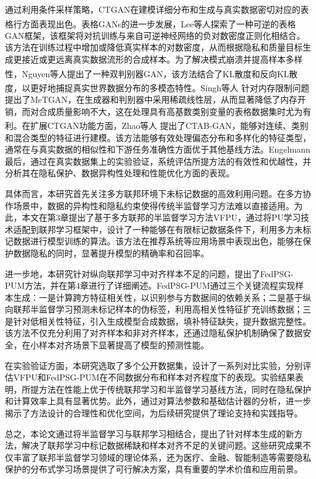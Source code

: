 通过利用条件采样策略，CTGAN在建模详细分布和生成与真实数据密切对应的表格行方面表现出色。表格GANs的进一步发展，Lee等人\textsuperscript{\cite{lee2021invertible}}探索了一种可逆的表格GAN框架，该框架将对抗训练与来自可逆神经网络的负对数密度正则化相结合。该方法在训练过程中增加或降低真实样本的对数密度，从而根据隐私和质量目标生成更接近或更远离真实数据流形的合成样本。为了解决模式崩溃并提高样本多样性，Nguyen等人\textsuperscript{\cite{nguyen2017dual}}提出了一种双判别器GAN，该方法结合了KL散度和反向KL散度，以更好地捕捉真实世界数据分布的多模态特性。Singh等人\textsuperscript{\cite{singh2021metgan}} 针对内存限制问题提出了MeTGAN，在生成器和判别器中采用稀疏线性层，从而显著降低了内存开销，而对合成质量影响不大，这在处理具有高基数类别变量的表格数据集时尤为有利。在扩展CTGAN功能方面，Zhao等人\textsuperscript{\cite{zhao2021ctab}} 提出了CTAB-GAN，能够对连续、类别和混合类型的特征进行建模。该方法能够有效处理偏态分布和多样化的特征类型，通常在与真实数据的相似性和下游任务准确性方面优于其他基线方法。Engelmann最后，通过在真实数据集上的实验验证，系统评估所提方法的有效性和优越性，并分析其在隐私保护、数据异构性处理和性能优化方面的表现。

具体而言，本研究首先关注多方联邦环境下未标记数据的高效利用问题。在多方协作场景中，数据的异构性和隐私约束使得传统半监督学习方法难以直接适用。为此，本文在第3章提出了基于多方联邦的半监督学习方法VFPU，通过将PU学习技术适配到联邦学习框架中，设计了一种能够在有限标记数据条件下，利用多方未标记数据进行模型训练的算法。该方法在推荐系统等应用场景中表现出色，能够在保护数据隐私的同时，显著提升模型的精确率和召回率。

进一步地，本研究针对纵向联邦学习中对齐样本不足的问题，提出了FedPSG-PUM方法，并在第4章进行了详细阐述。FedPSG-PUM通过三个关键流程实现样本生成：一是计算跨方特征相关性，以识别参与方数据间的依赖关系；二是基于纵向联邦半监督学习预测未标记样本的伪标签，利用高相关性特征扩充训练数据；三是针对低相关性特征，引入生成模型合成数据，填补特征缺失，提升数据完整性。该方法不仅充分利用了对齐样本和非对齐样本，还通过隐私保护机制确保了数据安全，在小样本对齐场景下显著提高了模型的预测性能。

在实验验证方面，本研究选取了多个公开数据集，设计了一系列对比实验，分别评估VFPU和FedPSG-PUM在不同数据分布和样本对齐程度下的表现。实验结果表明，所提方法在性能上优于传统联邦学习和半监督学习基线方法，同时在隐私保护和计算效率上具有显著优势。此外，通过对算法参数和基础估计器的分析，进一步揭示了方法设计的合理性和优化空间，为后续研究提供了理论支持和实践指导。

总之，本论文通过将半监督学习与联邦学习相结合，提出了针对样本生成的新方法，解决了联邦学习中标记数据稀缺和样本对齐不足的关键问题。这些研究成果不仅丰富了联邦半监督学习领域的理论体系，还为医疗、金融、智能制造等需要隐私保护的分布式学习场景提供了可行解决方案，具有重要的学术价值和应用前景。

